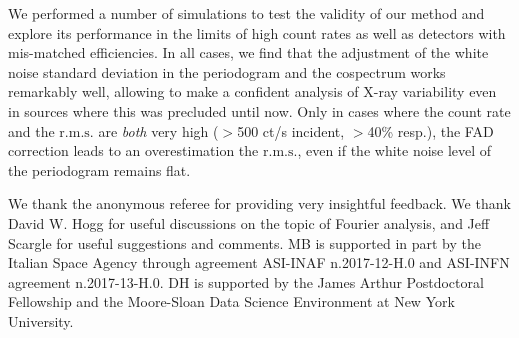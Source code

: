 \documentclass[twocolumn]{aastex61}
\newcommand{\rms}{\ensuremath{\mathrm{r.m.s.}}\xspace}
\begin{document}
We performed a number of simulations to test the validity of our method and explore its performance in the limits of high count rates as well as detectors with mis-matched efficiencies. 
In all cases, we find that the adjustment of the white noise standard deviation in the periodogram and the cospectrum works remarkably well, allowing to make a confident analysis of X-ray variability even in sources where this was precluded until now.
Only in cases where the count rate and the \rms are \textit{both} very high ($>$500 ct/s incident, $>$40\% resp.), the FAD correction leads to an overestimation the \rms, even if the white noise level of the periodogram remains flat.

\acknowledgments
We thank the anonymous referee for providing very insightful feedback.
We thank David W. Hogg for useful discussions on the topic of Fourier analysis, and Jeff Scargle for useful suggestions and comments.
MB is supported in part by the Italian Space Agency through agreement ASI-INAF n.2017-12-H.0 and ASI-INFN agreement n.2017-13-H.0.
DH is supported by the James Arthur Postdoctoral Fellowship and the Moore-Sloan Data Science Environment at New York University.


%
\end{document}
